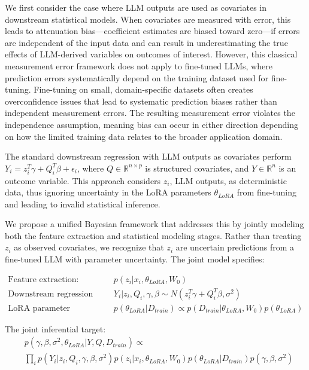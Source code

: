 \documentclass[11pt]{article}
\begin{document}
We first consider the case where LLM outputs are used as covariates in downstream statistical models. When covariates are measured with error, this leads to attenuation bias—coefficient estimates are biased toward zero—if errors are independent of the input data and can result in underestimating the true effects of LLM-derived variables on outcomes of interest. However, this classical measurement error framework does not apply to fine-tuned LLMs, where prediction errors systematically depend on the training dataset used for fine-tuning. Fine-tuning on small, domain-specific datasets often creates overconfidence issues that lead to systematic prediction biases rather than independent measurement errors. The resulting measurement error violates the independence assumption, meaning bias can occur in either direction depending on how the limited training data relates to the broader application domain.

The standard downstream regression with LLM outputs as covariates perform $Y_i = z_i^T\gamma + Q_i^T\beta + \epsilon_i$, where $Q \in \mathbb{R}^{n \times p}$ is structured covariates, and $Y \in \mathbb{R}^n$ is an outcome variable. This approach considers $z_i$, LLM outputs, as deterministic data, thus ignoring uncertainty in the LoRA parameters $\theta_{LoRA}$ from fine-tuning and leading to invalid statistical inference.

We propose a unified Bayesian framework that addresses this by jointly modeling both the feature extraction and statistical modeling stages. Rather than treating $z_i$ as observed covariates, we recognize that $z_i$ are uncertain predictions from a fine-tuned LLM with parameter uncertainty. The joint model specifies:

\begin{align}
\text{Feature extraction:} \quad &p(z_i|x_i, \theta_{LoRA}, W_0) \label{eq:feature_extraction} \\
\text{Downstream regression model:} \quad &Y_i|z_i, Q_i, \gamma, \beta \sim N(z_i^T\gamma + Q_i^T\beta, \sigma^2) \label{eq:regression_model} \\
\text{LoRA parameter posterior:} \quad &p(\theta_{LoRA}|D_{train}) \propto p(D_{train}|\theta_{LoRA}, W_0)p(\theta_{LoRA}) \label{eq:lora_posterior}
\end{align}

The joint inferential target:
\begin{align}
&p(\gamma, \beta, \sigma^2, \theta_{LoRA}|Y, Q, D_{train}) \propto \label{eq:joint_target} \\
&\prod_i p(Y_i|z_i, Q_i, \gamma, \beta, \sigma^2)p(z_i|x_i, \theta_{LoRA}, W_0)p(\theta_{LoRA}|D_{train})p(\gamma, \beta, \sigma^2) \nonumber
\end{align}
\end{document}

